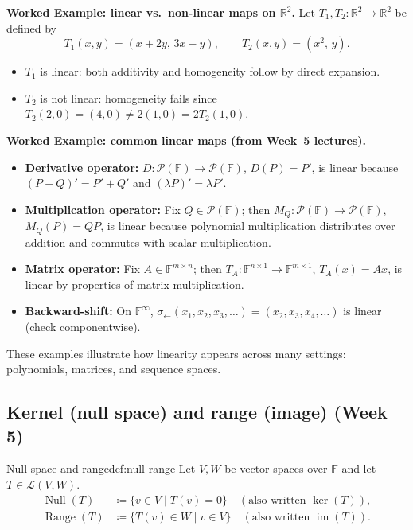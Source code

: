 \begin{examplebox}
\textbf{Worked Example: linear vs.\ non-linear maps on $\mathbb{R}^2$.}
Let $T_1,T_2:\mathbb{R}^2\to\mathbb{R}^2$ be defined by
\[
T_1(x,y)=(x+2y,\,3x-y),
\qquad
T_2(x,y)=(x^2,\,y).
\]
\begin{itemize}
\item $T_1$ is linear: both additivity and homogeneity follow by direct expansion.
\item $T_2$ is not linear: homogeneity fails since $T_2(2,0)=(4,0)\neq 2(1,0)=2T_2(1,0)$.
\end{itemize}
\end{examplebox}

\begin{examplebox}
\textbf{Worked Example: common linear maps (from Week~5 lectures).}
\begin{itemize}
\item \textbf{Derivative operator:} $D:\mathcal{P}(\mathbb{F})\to\mathcal{P}(\mathbb{F})$, $D(P)=P'$, is linear because $(P+Q)'=P'+Q'$ and $(\lambda P)'=\lambda P'$.
\item \textbf{Multiplication operator:} Fix $Q\in\mathcal{P}(\mathbb{F})$; then $M_Q:\mathcal{P}(\mathbb{F})\to\mathcal{P}(\mathbb{F})$, $M_Q(P)=QP$, is linear because polynomial multiplication distributes over addition and commutes with scalar multiplication.
\item \textbf{Matrix operator:} Fix $A\in\mathbb{F}^{m\times n}$; then $T_A:\mathbb{F}^{n\times 1}\to\mathbb{F}^{m\times 1}$, $T_A(x)=Ax$, is linear by properties of matrix multiplication.
\item \textbf{Backward-shift:} On $\mathbb{F}^\infty$, $\sigma_\leftarrow(x_1,x_2,x_3,\dots)=(x_2,x_3,x_4,\dots)$ is linear (check componentwise).
\end{itemize}
These examples illustrate how linearity appears across many settings: polynomials, matrices, and sequence spaces.
\end{examplebox}


\subsection{Kernel (null space) and range (image) (Week 5)}

\begin{definition}{Null space and range}{def:null-range}
Let $V,W$ be vector spaces over $\mathbb{F}$ and let $T\in\mathcal{L}(V,W)$.
\[
\begin{aligned}
\operatorname{Null}(T)&\coloneqq \{v\in V \mid T(v)=0\}
\quad(\text{also written }\ker(T)),\\
\operatorname{Range}(T)&\coloneqq \{T(v)\in W \mid v\in V\}
\quad(\text{also written }\operatorname{im}(T)).
\end{aligned}
\]
\end{definition}

